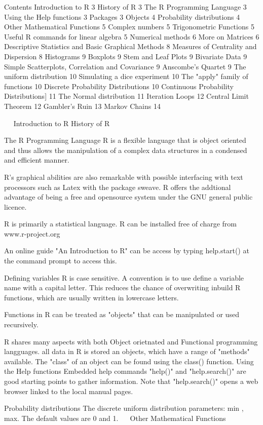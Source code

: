 Contents
Introduction to R	3
History of R	3
The R Programming Language	3
Using the Help functions	3
Packages	3
Objects	4
Probability distributions	4
Other Mathematical Functions	5
Complex numbers	5
Trigonometric  Functions	5
Useful R commands for linear algebra	5
Numerical methods	6
More on Matrices	6
Descriptive Statistics and Basic Graphical Methods	8
Measures of Centrality and Dispersion	8
Histograms	9
Boxplots	9
Stem and Leaf Plots	9
Bivariate Data	9
Simple Scatterplots, Correlation and Covariance	9
Anscombe’s Quartet	9
The uniform distribution	10
Simulating a dice experiment	10
The "apply" family of functions	10
Discrete Probability Distributions	10
Continuous Probability Distributions]	11
The Normal distribution	11
Iteration Loops	12
Central Limit Theorem	12
Gambler’s Ruin	13
Markov Chains	14

 
Introduction to R
History of R

The R Programming Language
R is a flexible language that is object oriented and thus allows the manipulation of a complex
data structures in a condensed and efficient manner.
 
R's graphical abilities are also remarkable with possible interfacing with text processors such as
Latex with the package sweave.
R offers the addtional advantage of being a free and opensource system under the GNU general
public licence.

R is primarily a statistical language.
R can be installed free of charge from www.r-project.org

An online guide "An Introduction to R" can be access by typing
help.start() at the command prompt to access this.

Defining variables
R is case sensitive.
A convention is to use define a variable name with a capital letter.
This reduces the chance of overwriting inbuild R functions, which are usually written in lowercase letters.


Functions in R can be treated as "objects" that can be manipulated or used recursively.

R shares many aspects with both Object orietnated and Functional programming langguages.
all data in R is stored an objects, which have a range of "methods" available.
The "class" of an object can be found using the class() function.
Using the Help functions
Embedded help commands "help()" and "help.search()" are good starting points to gather information. 
Note that "help.search()" opens a web browser linked to the local manual pages.
 
 
Probability distributions
The discrete uniform distribution
parameters: min , max.
The default values are 0 and 1.
 
Other Mathematical Functions

